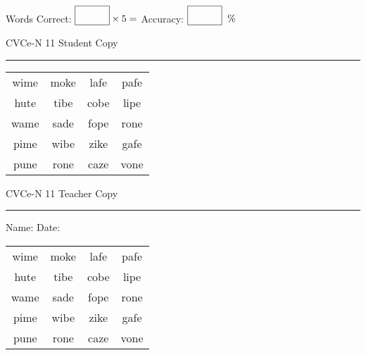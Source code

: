 \documentclass{memoir}
\begin{document}
\small

Words Correct: $\fbox{\phantom{\huge 100}} \times 5 = $ Accuracy: $\fbox{\phantom{\huge 100}}\;\; \%$ 

\vfill

\newpage


\footnotesize \noindent
CVCe-N 11 \hfill Student Copy
\smallskip
\hrule

\Large

\setlength{\tabcolsep}{14pt}
\def\arraystretch{2}

{\selectfont


\begin{vplace}[0.5]
\begin{center}
\begin{tabular}{cccc}
wime & moke & lafe & pafe \\
hute & tibe & cobe & lipe \\
wame & sade & fope & rone \\
pime & wibe & zike & gafe \\
pune & rone & caze & vone \\
\end{tabular}
\end{center}
\end{vplace}

}

\newpage

\footnotesize \noindent
CVCe-N 11 \hfill Teacher Copy
\smallskip
\hrule

\small

\vfill

\noindent
Name: \underline{\hspace{1.75in}} \hfill Date: \underline{\hspace{1in}}

\Large

{\selectfont


\begin{vplace}[0.5]
\begin{center}
\begin{tabular}{cccc}
wime & moke & lafe & pafe \\
hute & tibe & cobe & lipe \\
wame & sade & fope & rone \\
pime & wibe & zike & gafe \\
pune & rone & caze & vone \\
\end{tabular}
\end{center}
\end{vplace}



}
\end{document}
